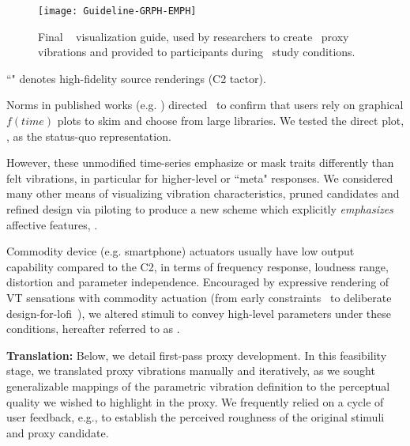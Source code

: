         \begin{figure*}
        \centering
                \texttt{[image: Guideline-GRPH-EMPH]}
                \caption{Final \linear~ visualization guide, used by researchers to create \linear~proxy vibrations and provided to participants during \linear~study conditions.}
            \label{fig:vis:ref:guideline}
    \end{figure*}

``\hifi" denotes high-fidelity source renderings (C2 tactor).

Norms in published works (e.g. \cite{Chan2008}) directed~\cite{Seifi2015} to confirm that users %
rely on graphical $f(time)$ plots to skim and choose from large libraries.  We tested the direct plot, \original, as the status-quo representation.

However, these unmodified time-series emphasize or mask traits differently than felt vibrations, in particular for higher-level or ``meta" responses. %
We considered many other means of visualizing vibration characteristics, pruned candidates and refined design via piloting to produce a new scheme which explicitly \textit{emphasizes} affective features, \linear.


Commodity device (e.g. smartphone) actuators usually have low output capability compared to the C2, in terms of frequency response, loudness range, distortion and parameter independence. Encouraged %
by expressive rendering of VT sensations with commodity actuation (from early constraints~\cite{Chan2008} to deliberate design-for-lofi~\cite{Israr2015}), we altered stimuli to convey high-level parameters under these conditions,
hereafter referred to as \lofi.

\textbf{Translation:} 
Below, we detail first-pass proxy development.
In this feasibility stage,  we translated proxy vibrations manually and iteratively, as we sought generalizable mappings of the parametric vibration definition to the perceptual quality we wished to highlight in the proxy. We frequently relied on a cycle of user feedback, e.g., to establish the perceived  roughness of the original stimuli and proxy candidate. 


